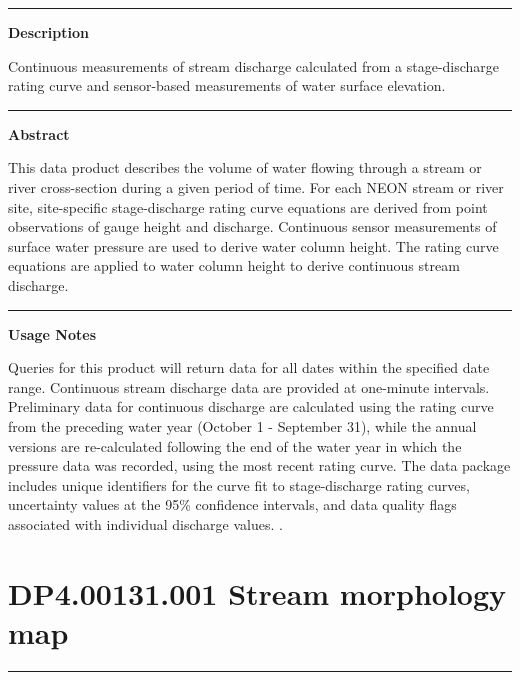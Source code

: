 \documentclass[]{article}
\begin{document}
\begin{center}\rule{0.5\linewidth}{\linethickness}\end{center}

\textbf{Description}

Continuous measurements of stream discharge calculated from a
stage-discharge rating curve and sensor-based measurements of water
surface elevation.

\begin{center}\rule{0.5\linewidth}{\linethickness}\end{center}

\textbf{Abstract}

This data product describes the volume of water flowing through a stream
or river cross-section during a given period of time. For each NEON
stream or river site, site-specific stage-discharge rating curve
equations are derived from point observations of gauge height and
discharge. Continuous sensor measurements of surface water pressure are
used to derive water column height. The rating curve equations are
applied to water column height to derive continuous stream discharge.

\begin{center}\rule{0.5\linewidth}{\linethickness}\end{center}

\textbf{Usage Notes}

Queries for this product will return data for all dates within the
specified date range. Continuous stream discharge data are provided at
one-minute intervals. Preliminary data for continuous discharge are
calculated using the rating curve from the preceding water year (October
1 - September 31), while the annual versions are re-calculated following
the end of the water year in which the pressure data was recorded, using
the most recent rating curve. The data package includes unique
identifiers for the curve fit to stage-discharge rating curves,
uncertainty values at the 95\% confidence intervals, and data quality
flags associated with individual discharge values. \newpage
.

\section{DP4.00131.001 Stream morphology
map}\label{dp4.00131.001-stream-morphology-map}

\begin{center}\rule{0.5\linewidth}{\linethickness}\end{center}
\end{document}
